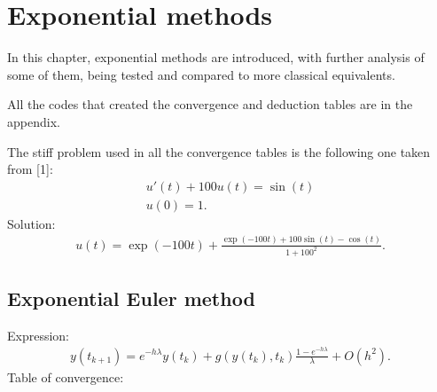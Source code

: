 \documentclass[letterpaper,10pt,english]{jupyterBook}
\begin{document}
\sphinxstepscope


\section{Exponential methods}
\label{\detokenize{cap4:exponential-methods}}\label{\detokenize{cap4::doc}}
\sphinxAtStartPar
In this chapter, exponential methods are introduced, with further analysis of some of them, being tested and compared to more classical equivalents.

\sphinxAtStartPar
All the codes that created the convergence and deduction tables are in the appendix.

\sphinxAtStartPar
The stiff problem used in all the convergence tables is the following one taken from {[}1{]}:
\begin{equation*}
\begin{split}
    u'(t) + 100 u(t) = \sin(t)\\
    u(0) = 1.
\end{split}
\end{equation*}
\sphinxAtStartPar
Solution:
\begin{equation*}
\begin{split}
u(t) = \exp(-100t)+\frac{\exp(-100t)+100\sin(t)-\cos(t)}{1+100^2}.
\end{split}
\end{equation*}

\subsection{Exponential Euler method}
\label{\detokenize{cap4:exponential-euler-method}}
\sphinxAtStartPar
Expression:
\begin{equation*}
\begin{split}
  y(t_{k+1}) = e^{-h \lambda}y(t_k) + g(y(t_k), t_k) \frac{1-e^{-h \lambda}}{\lambda} + O(h^2).
\end{split}
\end{equation*}
\sphinxAtStartPar
Table of convergence:
\end{document}
